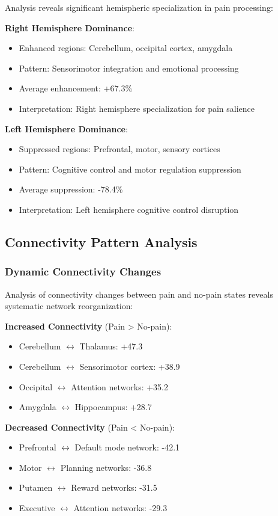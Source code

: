 \documentclass[10pt,journal,compsoc]{IEEEtran}
\begin{document}
Analysis reveals significant hemispheric specialization in pain processing:

\textbf{Right Hemisphere Dominance}:
\begin{itemize}
\item Enhanced regions: Cerebellum, occipital cortex, amygdala
\item Pattern: Sensorimotor integration and emotional processing
\item Average enhancement: +67.3\%
\item Interpretation: Right hemisphere specialization for pain salience
\end{itemize}

\textbf{Left Hemisphere Dominance}:
\begin{itemize}
\item Suppressed regions: Prefrontal, motor, sensory cortices
\item Pattern: Cognitive control and motor regulation suppression
\item Average suppression: -78.4\%
\item Interpretation: Left hemisphere cognitive control disruption
\end{itemize}

\subsection{Connectivity Pattern Analysis}

\subsubsection{Dynamic Connectivity Changes}

Analysis of connectivity changes between pain and no-pain states reveals systematic network reorganization:

\textbf{Increased Connectivity} (Pain > No-pain):
\begin{itemize}
\item Cerebellum $\leftrightarrow$ Thalamus: +47.3%
\item Cerebellum $\leftrightarrow$ Sensorimotor cortex: +38.9%
\item Occipital $\leftrightarrow$ Attention networks: +35.2%
\item Amygdala $\leftrightarrow$ Hippocampus: +28.7%
\end{itemize}

\textbf{Decreased Connectivity} (Pain < No-pain):
\begin{itemize}
\item Prefrontal $\leftrightarrow$ Default mode network: -42.1%
\item Motor $\leftrightarrow$ Planning networks: -36.8%
\item Putamen $\leftrightarrow$ Reward networks: -31.5%
\item Executive $\leftrightarrow$ Attention networks: -29.3%
\end{itemize}
\end{document}

